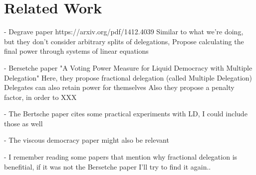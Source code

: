 
\chapter{Related Work}


- Degrave paper https://arxiv.org/pdf/1412.4039
	Similar to what we're doing, but they don't consider arbitrary splits of delegations, 
	Propose calculating the final power through systems of linear equations

- Bersetche paper "A Voting Power Measure for Liquid Democracy with Multiple Delegation" \cite{bersetcheGeneralizingLiquidDemocracy2022}
	Here, they propose fractional delegation (called Multiple Delegation)
	Delegates can also retain power for themselves
	Also they propose a penalty factor, in order to XXX

- The Bertsche paper cites some practical experiments with LD, I could include those as well


- The viscous democracy paper might also be relevant

- I remember reading some papers that mention why fractional delegation is benefitial, if it was not the Bersetche paper I'll try to find it again..

